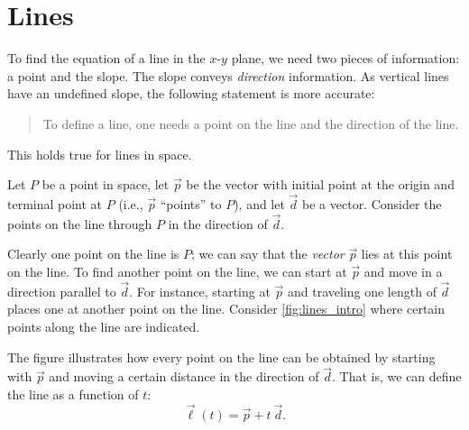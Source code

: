 \section{Lines}\label{sec:lines}

To find the equation of a line in the $x$-$y$ plane, we need two pieces of information: a point and the slope. The slope conveys \emph{direction} information. As vertical lines have an undefined slope, the following statement is more accurate:
\begin{quotation}
\noindent To define a line, one needs a point on the line and the direction of the line.
\end{quotation}

This holds true for lines in space.\bigskip

Let $P$ be a point in space, let $\vec p$ be the vector with initial point at the origin and terminal point at $P$ (i.e., $\vec p$ ``points'' to $P$), and let $\vec d$ be a vector. Consider the points on the line through $P$ in the direction of $\vec d$. 

Clearly one point on the line is $P$; we can say that the \emph{vector} $\vec p$ lies at this point on the line. To find another point on the line, we can start at $\vec p$ and move in a  direction parallel to $\vec d$. For instance, starting at $\vec p$ and traveling one length of $\vec d$ places one at another point on the line. Consider \autoref{fig:lines_intro} where certain points along the line are indicated.


The figure illustrates how every point on the line can be obtained by starting with $\vec p$ and moving a certain distance in the direction of $\vec d$. That is, we can define the line as a function of $t$:
\begin{equation}
\vec\ell(t) = \vec p + t\ \vec d.\label{eq:lines1}
\end{equation}

